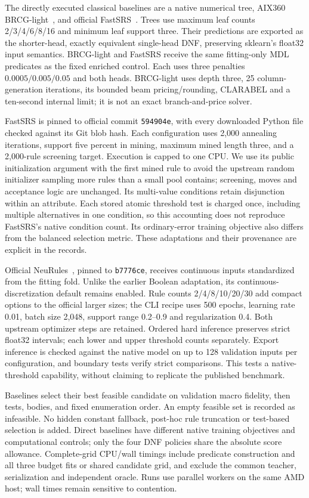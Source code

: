 \documentclass[review,12pt]{elsarticle}
\begin{document}
The directly executed classical baselines are a native numerical tree, AIX360 BRCG-light~\citep{dash2018,lawless2023}, and official FastSRS~\citep{molero2026}. Trees use maximum leaf counts 2/3/4/6/8/16 and minimum leaf support three. Their predictions are exported as the shorter-head, exactly equivalent single-head DNF, preserving sklearn's float32 input semantics. BRCG-light and FastSRS receive the same fitting-only MDL predicates as the fixed enriched control. Each uses three penalties $0.0005/0.005/0.05$ and both heads. BRCG-light uses depth three, 25 column-generation iterations, its bounded beam pricing/rounding, CLARABEL and a ten-second internal limit; it is not an exact branch-and-price solver.

FastSRS is pinned to official commit \texttt{594904e}, with every downloaded Python file checked against its Git blob hash. Each configuration uses 2,000 annealing iterations, support five percent in mining, maximum mined length three, and a 2,000-rule screening target. Execution is capped to one CPU. We use its public initialization argument with the first mined rule to avoid the upstream random initializer sampling more rules than a small pool contains; screening, moves and acceptance logic are unchanged. Its multi-value conditions retain disjunction within an attribute. Each stored atomic threshold test is charged once, including multiple alternatives in one condition, so this accounting does not reproduce FastSRS's native condition count. Its ordinary-error training objective also differs from the balanced selection metric. These adaptations and their provenance are explicit in the records.

Official NeuRules~\citep{xu2025}, pinned to \texttt{b7776ce}, receives continuous inputs standardized from the fitting fold. Unlike the earlier Boolean adaptation, its continuous-discretization default remains enabled. Rule counts 2/4/8/10/20/30 add compact options to the official larger sizes; the CLI recipe uses 500 epochs, learning rate 0.01, batch size 2,048, support range 0.2--0.9 and regularization 0.4. Both upstream optimizer steps are retained. Ordered hard inference preserves strict float32 intervals; each lower and upper threshold counts separately. Export inference is checked against the native model on up to 128 validation inputs per configuration, and boundary tests verify strict comparisons. This tests a native-threshold capability, without claiming to replicate the published benchmark.

Baselines select their best feasible candidate on validation macro fidelity, then tests, bodies, and fixed enumeration order. An empty feasible set is recorded as infeasible. No hidden constant fallback, post-hoc rule truncation or test-based selection is added. Direct baselines have different native training objectives and computational controls; only the four DNF policies share the absolute score allowance. Complete-grid CPU/wall timings include predicate construction and all three budget fits or shared candidate grid, and exclude the common teacher, serialization and independent oracle. Runs use parallel workers on the same AMD host; wall times remain sensitive to contention.
\end{document}
